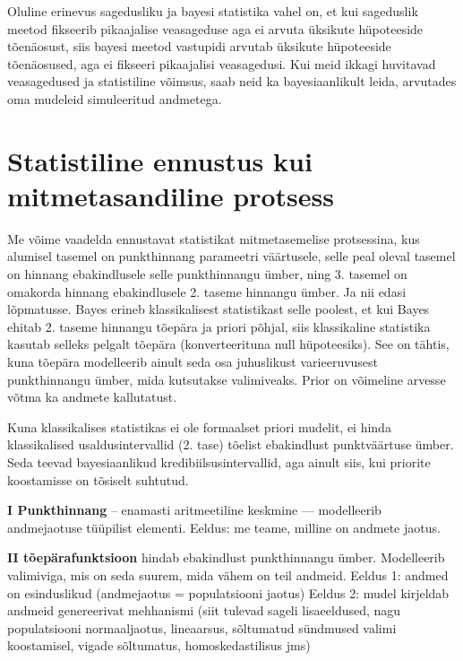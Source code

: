 \documentclass[]{book}
\begin{document}
Oluline erinevus sagedusliku ja bayesi statistika vahel on, et kui sageduslik meetod fikseerib pikaajalise veasageduse aga ei arvuta üksikute hüpoteeside tõenäosust, siis bayesi meetod vastupidi arvutab üksikute hüpoteeside tõenäosused, aga ei fikseeri pikaajalisi veasagedusi. Kui meid ikkagi huvitavad veasagedused ja statistiline võimsus, saab neid ka bayesiaanlikult leida, arvutades oma mudeleid simuleeritud andmetega.

\hypertarget{statistiline-ennustus-kui-mitmetasandiline-protsess}{%
\section*{Statistiline ennustus kui mitmetasandiline protsess}\label{statistiline-ennustus-kui-mitmetasandiline-protsess}}

Me võime vaadelda ennustavat statistikat mitmetasemelise protsessina, kus alumisel tasemel on punkthinnang parameetri väärtusele, selle peal oleval tasemel on hinnang ebakindlusele selle punkthinnangu ümber, ning 3. tasemel on omakorda hinnang ebakindlusele 2. taseme hinnangu ümber. Ja nii edasi lõpmatusse. Bayes erineb klassikalisest statistikast selle poolest, et kui Bayes ehitab 2. taseme hinnangu tõepära ja priori põhjal, siis klassikaline statistika kasutab selleks pelgalt tõepära (konverteerituna null hüpoteesiks). See on tähtis, kuna tõepära modelleerib ainult seda osa juhuslikust varieeruvusest punkthinnangu ümber, mida kutsutakse valimiveaks. Prior on võimeline arvesse võtma ka andmete kallutatust.

Kuna klassikalises statistikas ei ole formaalset priori mudelit, ei hinda klassikalised usaldusintervallid (2. tase) tõelist ebakindlust punktväärtuse ümber. Seda teevad bayesiaanlikud kredibiilsusintervallid, aga ainult siis, kui priorite koostamisse on tõsiselt suhtutud.

\textbf{I Punkthinnang} -- enamasti aritmeetiline keskmine --- modelleerib andmejaotuse tüüpilist elementi.
Eeldus: me teame, milline on andmete jaotus.

\textbf{II tõepärafunktsioon} hindab ebakindlust punkthinnangu ümber.
Modelleerib valimiviga, mis on seda suurem, mida vähem on teil andmeid.
Eeldus 1: andmed on esinduslikud (andmejaotus = populatsiooni jaotus)
Eeldus 2: mudel kirjeldab andmeid genereerivat mehhanismi (siit tulevad sageli lisaeeldused, nagu populatsiooni normaaljaotus, lineaarsus, sõltumatud sündmused valimi koostamisel, vigade sõltumatus, homoskedastilisus jms)
\end{document}
